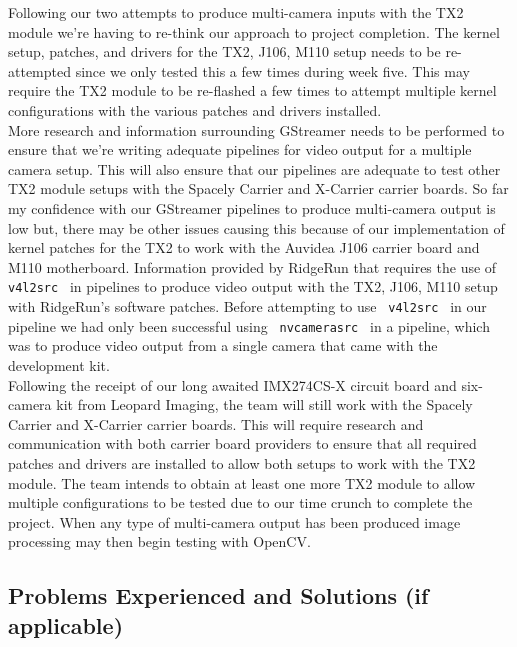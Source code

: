 \documentclass[letterpaper,10pt,serif,draftclsnofoot,onecolumn,compsoc,titlepage]{IEEEtran}
\begin{document}
Following our two attempts to produce multi-camera inputs with the TX2 module 
we're having to re-think our approach to project completion. The kernel setup, patches, 
and drivers for the TX2, J106, M110 setup needs to be re-attempted since we only tested 
this a few times during week five. This may require the TX2 module to be re-flashed a 
few times to attempt multiple kernel configurations with the various patches and drivers 
installed. \\

More research and information surrounding GStreamer needs to be performed to ensure that we're 
writing adequate pipelines for video output for a multiple camera setup. 
This will also ensure that our pipelines are adequate to test other TX2 module setups 
with the Spacely Carrier and X-Carrier carrier boards.
So far my confidence with our GStreamer pipelines to produce multi-camera output is 
low but, there may be other issues causing this because of our implementation of kernel 
patches for the TX2 to work with the Auvidea J106 carrier board and M110 motherboard. 
Information provided by RidgeRun that requires the use of 
\texttt{ v4l2src } in pipelines to produce video output with the TX2, J106, M110 setup with 
RidgeRun's software patches. 
Before attempting to use \texttt{ v4l2src } in our pipeline we had only been successful 
using \texttt{ nvcamerasrc } in a pipeline, which was to produce video output from a 
single camera that came with the development kit. \\

Following the receipt of our long awaited IMX274CS-X circuit board and six-camera kit 
from Leopard Imaging, the team will 
still work with the Spacely Carrier and X-Carrier carrier boards. This will 
require research and communication with both carrier board providers to ensure that 
all required patches and drivers are installed 
to allow both setups to work with the TX2 module. The team intends to obtain at 
least one more TX2 module to allow multiple configurations to be tested due to our 
time crunch to complete the project. When any type of multi-camera output has been 
produced image processing may then begin testing with OpenCV. \\

\subsection{Problems Experienced and Solutions (if applicable)}
\end{document}
